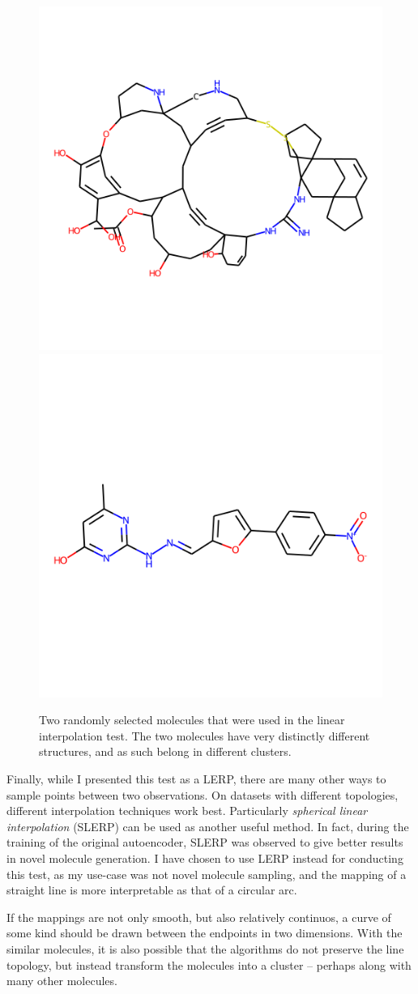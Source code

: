 \begin{figure}[!h]
	\centering
	\includegraphics[width=0.4\columnwidth]{figures/random_mol1}
	\includegraphics[width=0.4\columnwidth]{figures/random_mol2}
	\caption{Two randomly selected molecules that were used in the linear interpolation test. The two molecules have very distinctly different structures, and as such belong in different clusters.}
	\label{fig:random_mol}
\end{figure}

Finally, while I presented this test as a LERP, there are many other ways to sample points between two observations. On datasets with different topologies, different interpolation techniques work best. Particularly \textit{spherical linear interpolation} (SLERP) can be used as another useful method. In fact, during the training of the original autoencoder, SLERP was observed to give better results in novel molecule generation. \cite{bib:thesis} I have chosen to use LERP instead for conducting this test, as my use-case was not novel molecule sampling, and the mapping of a straight line is more interpretable as that of a circular arc.

If the mappings are not only smooth, but also relatively continuos, a curve of some kind should be drawn between the endpoints in two dimensions. With the similar molecules, it is also possible that the algorithms do not preserve the line topology, but instead transform the molecules into a cluster -- perhaps along with many other molecules. 

